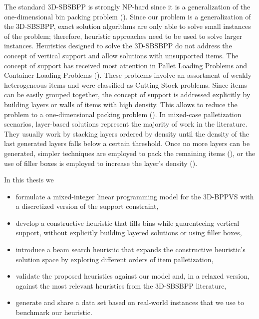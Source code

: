 The standard 3D-SBSBPP is strongly NP-hard since it is a generalization of the one-dimensional bin packing problem (\cite{martello2000three}).
Since our problem is a generalization of the 3D-SBSBPP, exact solution algorithms are only able to solve small instances of the problem; therefore, heuristic approaches need to be used to solve larger instances.
Heuristics designed to solve the 3D-SBSBPP do not address the concept of vertical support and allow solutions with unsupported items.
The concept of support has received most attention in Pallet Loading Problems and Container Loading Problems (\cite{Calzavara2021, kurpel2020exact}).
These problems involve an assortment of weakly heterogeneous items and were classified as Cutting Stock problems.
Since items can be easily grouped together, the concept of support is addressed explicitly by building layers or walls of items with high density. This allows to reduce the problem to a one-dimensional packing problem (\cite{BORTFELDT20131}).
In mixed-case palletization scenarios, layer-based solutions represent the majority of work in the literature. They usually work by stacking layers ordered by density until the density of the last generated layers falls below a certain threshold.
Once no more layers can be generated, simpler techniques are employed to pack the remaining items (\cite{elhedhli2019three}), or the use of filler boxes is employed to increase the layer's density (\cite{Calzavara2021}).

In this thesis we
\begin{itemize}
    \item formulate a mixed-integer linear programming model for the 3D-BPPVS with a discretized version of the support constraint,
    \item develop a constructive heuristic that fills bins while guarenteeing vertical support, without explicitly building layered solutions or using filler boxes,
    \item introduce a beam search heuristic that expands the constructive heuristic's solution space by exploring different orders of item palletization,
    \item validate the proposed heuristics against our model and, in a relaxed version, against the most relevant heuristics from the 3D-SBSBPP literature,
    \item generate and share a data set based on real-world instances that we use to benchmark our heuristic.
\end{itemize}

